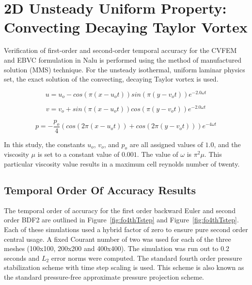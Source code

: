 \section{2D Unsteady Uniform Property: Convecting Decaying Taylor Vortex}

Verification of first-order and second-order temporal accuracy for the
CVFEM and EBVC formulation in Nalu is performed using the method of manufactured 
solution (MMS) technique. For the unsteady isothermal, uniform laminar physics set,
the exact solution of the convecting, decaying Taylor vortex is used.

\begin{equation}
  u = u_o - cos(\pi(x-u_ot)) sin(\pi(y-v_ot))e^{-2.0\omega t}
\label{advConvTV_u}
\end{equation}

\begin{equation}
  v = v_o + sin(\pi(x-u_ot)) cos(\pi(y-v_ot))e^{-2.0\omega t} 
\label{advConvTV_v}
\end{equation}

\begin{equation}
  p = -\frac{p_o}{4}(cos(2\pi(x-u_ot)) + cos(2\pi(y-v_ot)))e^{-4\omega t}
\label{advConvTV_p}
\end{equation}

In this study, the constants $u_o$, $v_o$, and $p_o$ are all assigned values of $1.0$,
and the viscosity $\mu$ is set to a
constant value of $0.001$. The value of $\omega$ is $\pi^2\mu$. This particular viscosity value 
results in a maximum cell reynolds number of twenty.  

\subsection{Temporal Order Of Accuracy Results}
The temporal order of accuracy for the first order backward Euler and second order BDF2
are outlined in Figure~\ref{fig:fo4thTstep} and Figure~\ref{fig:fo4thTstep}. Each of these
simulations used a hybrid factor of zero to ensure pure second order central usage. A
fixed Courant number of two was used for each of the three meshes (100x100, 200x200 and 400x400).
The simulation was run out to 0.2 seconds and $L_2$ error norms were computed. The standard
fourth order pressure stabilization scheme with time step scaling is used. This scheme is also
known as the standard pressure-free approximate pressure projection scheme.

